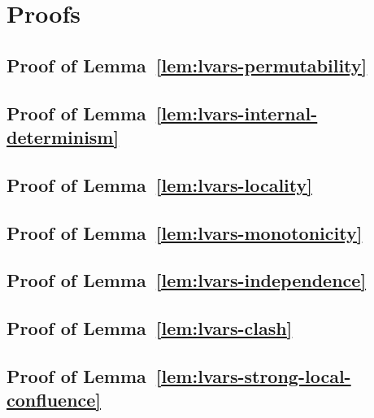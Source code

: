 \chapter{Proofs}\label{app:proofs}

\section{Proof of Lemma~\ref{lem:lvars-permutability}}\label{section:lvars-permutability-proof}


\section{Proof of Lemma~\ref{lem:lvars-internal-determinism}}\label{section:lvars-internal-determinism-proof}


\section{Proof of Lemma~\ref{lem:lvars-locality}}\label{section:lvars-locality-proof}


\section{Proof of Lemma~\ref{lem:lvars-monotonicity}}\label{section:lvars-monotonicity-proof}


\section{Proof of Lemma~\ref{lem:lvars-independence}}\label{section:lvars-independence-proof}


\section{Proof of Lemma~\ref{lem:lvars-clash}}\label{section:lvars-clash-proof}


\section{Proof of Lemma~\ref{lem:lvars-strong-local-confluence}}\label{section:lvars-strong-local-confluence-proof}


